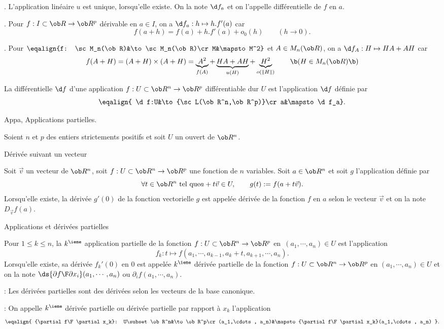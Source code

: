 \Remarque. L'application linéaire $u$ est unique, lorsqu'elle existe. 
On la note $\d f_a$ et 
on l'appelle différentielle de $f$ en $a$. 
\bigskip

\Exemple. Pour $f:I\subset \ob R\to\ob R^p$ dérivable en $a\in I$, on a $\d f_a:h\mapsto h.f'(a)$ car 
$$
f(a+h)=f(a)+h.f'(a)+o_0(h)\qquad(h\to 0). 
$$
\smallskip

\Exemple. Pour $\eqalign{f: \sc M_n(\ob R)&\to\sc M_n(\ob R)\cr M&\mapsto  M^2}$ et $A\in\sc M_n(\ob R)$, 
on a $\d f_A:H\mapsto HA+AH$ car 
$$
f(A+H)=(A+H)\times(A+H)=\underbrace{A^2}_{f(A)}+\underbrace{HA+AH}_{u(H)}
+\underbrace{H^2}_{o(\|H\|)}\qquad\b(H\in\sc M_n(\ob R)\b)
$$

\Definition []  La différentielle $\d f$ d'une application $f:U\subset\ob R^n\to\ob R^p$ différentiable dur $U$ est l'application $\d f$ définie par 
$$
\eqalign{ \d f:U&\to{\sc L(\ob R^n,\ob R^p)}\cr  a&\mapsto  \d f_a}.
$$

\Subsection Appa, Applications partielles. 

\noindent 
Soient $n$ et $p$ des entiers strictements positifs et soit $U$ un ouvert de $\ob R^n$. 
\bigskip

\Concept [] Dérivée suivant un vecteur

\Definition []  Soit $\vec v$ un vecteur de $\ob R^n$, soit $f:U\subset \ob R^n\to\ob R^p$ une fonction de $n$ variables. Soit $a\in\ob R^n$ et soit $g$ l'application définie par 
$$
\forall t\in\ob R^n\mbox{ tel que}a+t\vec v\in U, \qquad g(t):=f(a+t\vec v).
$$
Lorsqu'elle existe, la dérivée $g'(0)$ de la fonction vectorielle $g$ est appelée dérivée de la fonction $f$ en $a$ selon le vecteur $\vec v$ et 
on la note $D_{\vec v}f(a)$. 
\bigskip 

\Concept [] Applications et dérivées partielles

\Definition []  Pour $1\le k\le n$, la $k^\ieme$ application partielle de la fonction $f:U\subset\ob R^n\to\ob R^p$ en~$(a_1,\cdots,a_n)\in U$ 
est l'application $$
f_k:t\mapsto f(a_1,\cdots,a_{k-1},a_k+t,a_{k+1},\cdots,a_n).
$$ 
Lorsqu'elle existe, sa dérivée $f_k'(0)$ en $0$ est appelée $k^\ieme$ dérivée partielle de la fonction $f:U\subset\ob R^n\to\ob R^p$ 
en $(a_1,\cdots,a_n)\in U$ et 
on la note $\ds {\partial f\F\partial x_i}(a_1,\cdots, a_n)$ ou $\partial_if(a_1,\cdots,a_n)$.  
\bigskip

\Remarque :  Les dérivées partielles sont des dérivées selon les vecteurs de la base canonique. 
\bigskip


\Remarque :  On appelle $k^\ieme$ dérivée partielle ou dérivée partielle par rapport à $x_k$ l'application 
$$
\eqalign{
	{\partial f\F\partial x_k}: U\subset\ob R^n&\to\ob R^p\cr
	(a_1,\cdots, a_n)&\mapsto {\partial f\F\partial x_k}(a_1,\cdots, a_n)
}.
$$ 



